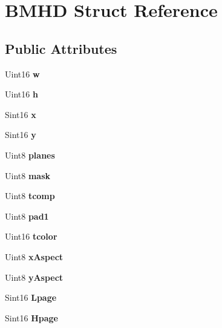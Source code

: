 \hypertarget{structBMHD}{}\section{B\+M\+HD Struct Reference}
\label{structBMHD}
\subsection*{Public Attributes}
\begin{DoxyCompactItemize}
\item 
\mbox{\label{structBMHD_a243b912ed653404a178d6cb9291025b1}} 
Uint16 {\bfseries w}
\item 
\mbox{\label{structBMHD_a813e44dad5aa11c8e4eb54b52a646449}} 
Uint16 {\bfseries h}
\item 
\mbox{\label{structBMHD_a6ae1ca9a597b76e04f79134c239abd85}} 
Sint16 {\bfseries x}
\item 
\mbox{\label{structBMHD_a27876b98ed5e9b3ea5bbcc5da72fff8d}} 
Sint16 {\bfseries y}
\item 
\mbox{\label{structBMHD_a176d660ed4df819f957e1d3f3edefe6c}} 
Uint8 {\bfseries planes}
\item 
\mbox{\label{structBMHD_a0cbe61c339c98169760dd61eacb5aa01}} 
Uint8 {\bfseries mask}
\item 
\mbox{\label{structBMHD_a29674687671d100def378dd377faf52a}} 
Uint8 {\bfseries tcomp}
\item 
\mbox{\label{structBMHD_a791eb72779d69a22e98120170828401d}} 
Uint8 {\bfseries pad1}
\item 
\mbox{\label{structBMHD_a46baa26ab3a8143f7d5504ca7e7cbc86}} 
Uint16 {\bfseries tcolor}
\item 
\mbox{\label{structBMHD_ad1b948c7fdb86dd802cba0a10df66bd1}} 
Uint8 {\bfseries x\+Aspect}
\item 
\mbox{\label{structBMHD_a518b0899286d4bde5d5bd4f7999f7a2e}} 
Uint8 {\bfseries y\+Aspect}
\item 
\mbox{\label{structBMHD_acaaa4dc99b90913376f70866b14a1fcc}} 
Sint16 {\bfseries Lpage}
\item 
\mbox{\label{structBMHD_a3c1c0bd2c647431d9c0f848fbbfd9377}} 
Sint16 {\bfseries Hpage}
\end{DoxyCompactItemize}


